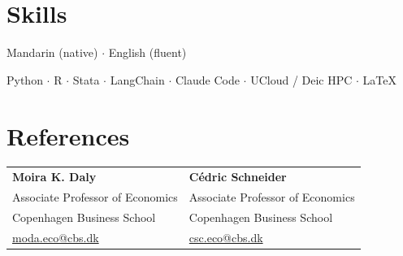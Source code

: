 \documentclass[11pt,a4paper]{article}
\newenvironment{dated}{%
  \begin{list}{}{%
    \setlength{\leftmargin}{2.75cm}\setlength{\labelwidth}{2.5cm}%
    \setlength{\labelsep}{0.25cm}\setlength{\itemsep}{1pt}%
    \setlength{\parsep}{0pt}\setlength{\topsep}{0pt}\setlength{\listparindent}{0pt}}%
}{\end{list}}
\newcommand{\entry}[2]{\item[{\makebox[2.5cm][l]{#1}}]#2}
\newcommand{\sep}{ $\cdot$ }
\begin{document}
\section{Skills}
\begin{dated}
  \entry{Languages}{Mandarin (native)\sep English (fluent)}
  \entry{Software}{Python\sep R\sep Stata\sep LangChain\sep Claude Code\sep UCloud / Deic HPC\sep \LaTeX}
\end{dated}

\section{References}
\begin{tabularx}{\textwidth}{@{}XX@{}}
  \textbf{Moira K. Daly} & \textbf{C\'edric Schneider}\\
  Associate Professor of Economics & Associate Professor of Economics\\
  Copenhagen Business School & Copenhagen Business School\\
  \href{mailto:moda.eco@cbs.dk}{moda.eco@cbs.dk} & \href{mailto:csc.eco@cbs.dk}{csc.eco@cbs.dk}
\end{tabularx}
\end{document}
